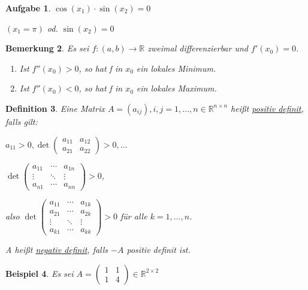 \documentclass[fontset=ubuntu,11pt,a4paper,fleqn,headsepline]{scrreprt}
\newtheorem{defi}{Definition}[section]
\newtheorem{bemerkung}[defi]{Bemerkung}
\newtheorem{beispiel}[defi]{Beispiel}
\newtheorem{aufg}[defi]{Aufgabe}
\begin{document}
\begin{multicols}{2}
\begin{aufg}
            \(\cos(x_1)\cdot\sin(x_2)=0\)
    
            \((x_1=\pi)\) od. \(\sin(x_2)=0\)
    \end{aufg}
    
    \begin{bemerkung}
        Es sei \(f:(a,b)\to\mathbb{R}\) zweimal differenzierbar und \(f'(x_0)=0\).
        \begin{enumerate}[label=\emph{(\roman*)}]
            \item Ist \(f''(x_0)>0\), so hat f in \(x_0\) ein lokales Minimum.
            \item Ist \(f''(x_0)<0\), so hat f in \(x_0\) ein lokales Maximum.
        \end{enumerate}
    \end{bemerkung}
    
    \begin{defi}
        Eine Matrix \(A=(a_{ij}), i,j=1,\dots,n \in \mathbb{R}^{n\times n}\) heißt \underline{positiv definit}, falls gilt:
    
    
        \(a_{11}>0,\det\begin{pmatrix}
        a_{11} & a_{12} \\ a_{21} & a_{22}
        \end{pmatrix} > 0, \dots\)
        
        \(\det\begin{pmatrix}
        a_{11} & \cdots & a_{1n} \\
        \vdots & \ddots & \vdots \\
        a_{n1} & \cdots & a_{nn}
        \end{pmatrix} > 0\), 
        
        also \(\det\begin{pmatrix}
        a_{11} & \cdots & a_{1k} \\
        a_{21} & \cdots & a_{2k} \\
        \vdots & \ddots & \vdots \\
        a_{k1} & \cdots & a_{kk}
        \end{pmatrix} > 0\) für alle \(k=1,\dots,n\).
        
        A heißt \underline{negativ definit}, falls \(-A\) positiv definit ist.
    \end{defi}
    
    \begin{beispiel}
        Es sei \(A=\begin{pmatrix}
        1 & 1 \\ 1 & 4
        \end{pmatrix} \in \mathbb{R}^{2\times 2}\)
        

\end{beispiel}
\end{multicols}
\end{document}
